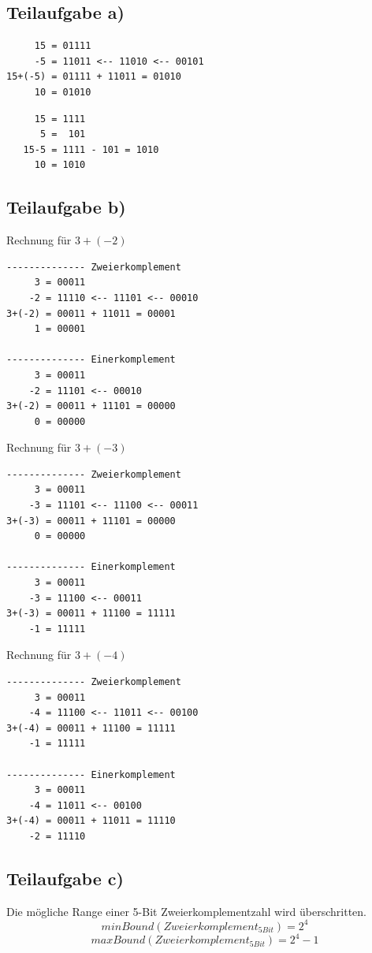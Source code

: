 \documentclass{llncs}
\begin{document}
\subsection*{Teilaufgabe a)}

\begin{verbatim}
     15 = 01111
     -5 = 11011 <-- 11010 <-- 00101
15+(-5) = 01111 + 11011 = 01010
     10 = 01010
\end{verbatim}

\begin{verbatim}
     15 = 1111
      5 =  101
   15-5 = 1111 - 101 = 1010
     10 = 1010
\end{verbatim}


\subsection*{Teilaufgabe b)}

Rechnung f\"ur $3+(-2)$
\begin{verbatim}
-------------- Zweierkomplement
     3 = 00011
    -2 = 11110 <-- 11101 <-- 00010
3+(-2) = 00011 + 11011 = 00001
     1 = 00001
     
-------------- Einerkomplement
     3 = 00011
    -2 = 11101 <-- 00010
3+(-2) = 00011 + 11101 = 00000
     0 = 00000
\end{verbatim}
Rechnung f\"ur $3+(-3)$
\begin{verbatim}
-------------- Zweierkomplement
     3 = 00011
    -3 = 11101 <-- 11100 <-- 00011
3+(-3) = 00011 + 11101 = 00000
     0 = 00000

-------------- Einerkomplement
     3 = 00011
    -3 = 11100 <-- 00011
3+(-3) = 00011 + 11100 = 11111
    -1 = 11111
\end{verbatim}
Rechnung f\"ur $3+(-4)$
\begin{verbatim}
-------------- Zweierkomplement
     3 = 00011
    -4 = 11100 <-- 11011 <-- 00100
3+(-4) = 00011 + 11100 = 11111
    -1 = 11111
    
-------------- Einerkomplement
     3 = 00011
    -4 = 11011 <-- 00100
3+(-4) = 00011 + 11011 = 11110
    -2 = 11110
\end{verbatim}

\subsection*{Teilaufgabe c)}

Die m\"ogliche Range einer 5-Bit Zweierkomplementzahl wird \"uberschritten.\\
$$minBound(Zweierkomplement_{5 Bit}) = 2^{4}$$
$$maxBound(Zweierkomplement_{5 Bit}) = 2^{4} -1$$
\end{document}
